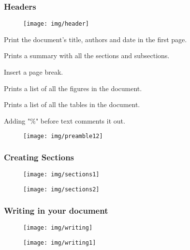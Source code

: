 \documentclass{beamer}
\begin{document}
\begin{frame}[fragile]
	\frametitle{Headers}
	\begin{figure}
		\centering
		\texttt{[image: img/header]}
	\end{figure}
	\begin{multicols}{2}
		[]
	\begin{description}
		\tiny
		\item[maketitle] Print the document's title, authors and date in the first page.
		\item[tableofcontents] Prints a summary with all the sections and subsections.
		\item[newpage] Insert a page break.
		\item[listoffigures] Prints a list of all the figures in the document.
		\item[listoftables] Prints a list of all the tables in the document.\
		\item[Comments] Adding "\%" before text comments it out.
	\end{description}
	\columnbreak
	\begin{figure}
		\centering
		\texttt{[image: img/preamble12]}
	\end{figure}
	
	\end{multicols}
	
\end{frame}
\begin{frame}[fragile]
	\frametitle{Creating Sections}
	\begin{figure}
		\texttt{[image: img/sections1]}
	\end{figure}
 \begin{figure}
 	\centering
 	\texttt{[image: img/sections2]}
 \end{figure}
\end{frame}

\begin{frame}[fragile]
	\frametitle{Writing in your document}
	\begin{figure}
		\centering
		\texttt{[image: img/writing]}
	\end{figure}
\begin{figure}
	\centering
	\texttt{[image: img/writing1]}
\end{figure}
\end{frame}
\end{document}
